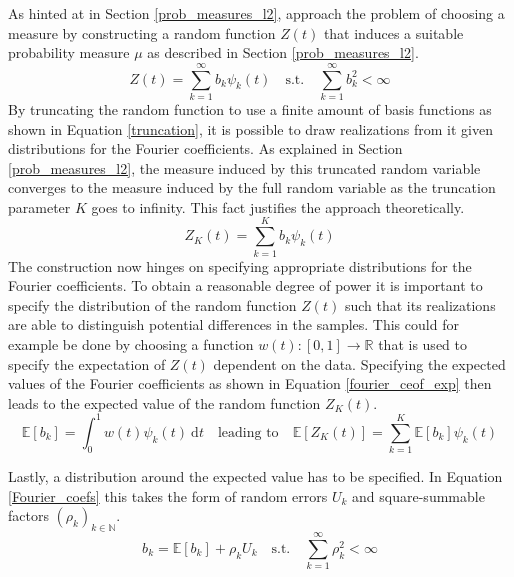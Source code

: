 \documentclass[12pt, a4paper]{article}
\theoremstyle{MAstyle} \newtheorem{assumption}{Assumption}[section]
\theoremstyle{MAstyle} \newtheorem{definition}{Definition}[section]
\theoremstyle{MAstyle} \newtheorem{theorem}{Theorem}[section]
\begin{document}
			As hinted at in Section \ref{prob_measures_l2}, \cite{bugni_permutation_2021} approach the problem of choosing a measure by constructing a random function $Z(t)$ that induces a suitable probability measure $\mu$ as described in Section \ref{prob_measures_l2}. 			
			\begin{equation}\label{non_truncated}
				Z(t) = \sum_{k = 1}^{\infty} b_k \psi_k(t)
				\quad \text{s.t.} \quad
				\sum_{k = 1}^{\infty} b_k^2 < \infty
			\end{equation}
			By truncating the random function to use a finite amount of basis functions as shown in Equation \ref{truncation}, it is possible to draw realizations from it given distributions for the  Fourier coefficients. As explained in Section \ref{prob_measures_l2}, the measure induced by this truncated random variable converges to the measure induced by the full random variable as the truncation parameter $K$ goes to infinity. This fact justifies the approach theoretically.
			\begin{equation}\label{truncation}
				Z_K(t) = \sum_{k = 1}^{K} b_k \psi_k(t)
			\end{equation}
			The construction now hinges on specifying appropriate distributions for the Fourier coefficients. To obtain a reasonable degree of power it is important to specify the distribution of the random function $Z(t)$ such that its realizations are able to distinguish potential differences in the samples. This could for example be done by choosing a function $w(t):[0,1] \rightarrow \mathbb{R}$ that is used to specify the expectation of $Z(t)$ dependent on the data. 
			Specifying the expected values of the Fourier coefficients as shown in Equation \ref{fourier_ceof_exp} then leads to the expected value of the random function $Z_K(t)$.
			\begin{equation}\label{fourier_ceof_exp}
				\mathbb{E}\left[b_k\right] = \int_{0}^{1}w(t)\psi_k(t) \ \mathrm{d}t
				\quad \text{leading to} \quad
				\mathbb{E}\left[Z_K(t)\right] = \sum_{k = 1}^{K} \mathbb{E}\left[b_k\right] \psi_k(t)
			\end{equation}
		
			\newpage
			Lastly, a distribution around the expected value has to be specified. In Equation \ref{Fourier_coefs} this takes the form of random errors $U_k$ and square-summable factors $(\rho_k)_{k \in \mathbb{N}}$.
			\begin{equation}\label{Fourier_coefs}
				b_k = \mathbb{E}\left[b_k\right] + \rho_k U_k
				\quad \text{s.t.} \quad
				\sum_{k = 1}^{\infty} \rho_k^2 < \infty 
			\end{equation}
\end{document}
